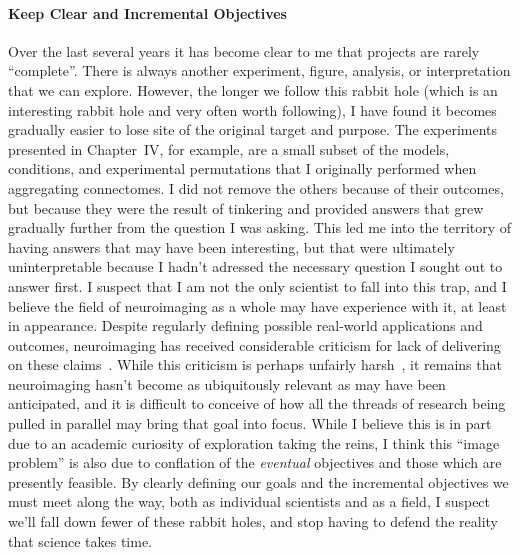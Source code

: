 \paragraph*{Keep Clear and Incremental Objectives}
Over the last several years it has become clear to me that projects are rarely ``complete''. There is always
another experiment, figure, analysis, or interpretation that we can explore. However, the longer we follow this
rabbit hole (which is an interesting rabbit hole and very often worth following), I have found it becomes gradually
easier to lose site of the original target and purpose. The experiments presented in Chapter~IV, for example, are a
small subset of the models, conditions, and experimental permutations that I originally performed when aggregating
connectomes. I did not remove the others because of their outcomes, but because they were the result of tinkering
and provided answers that grew gradually further from the question I was asking. This led me into the territory of
having answers that may have been interesting, but that were ultimately uninterpretable because I hadn't adressed
the necessary question I sought out to answer first. I suspect that I am not the only scientist to fall into this
trap, and I believe the field of neuroimaging as a whole may have experience with it, at least in appearance.
Despite regularly defining possible real-world applications and outcomes, neuroimaging has received considerable
criticism for lack of delivering on these claims~\cite{robinson2004fmri}. While this criticism is perhaps unfairly
harsh~\cite{lyon2017dead}, it remains that neuroimaging hasn't become as ubiquitously relevant as may have been
anticipated, and it is difficult to conceive of how all the threads of research being pulled in parallel may bring
that goal into focus. While I believe this is in part due to an academic curiosity of exploration taking the reins,
I think this ``image problem'' is also due to conflation of the \textit{eventual} objectives and those which are
presently feasible. By clearly defining our goals and the incremental objectives we must meet along the way, both
as individual scientists and as a field, I suspect we'll fall down fewer of these rabbit holes, and stop having to
defend the reality that science takes time.

